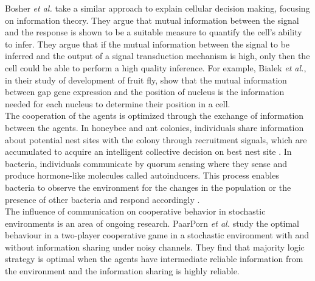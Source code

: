 Bosher \textit{et al.} \cite{Bowsher2014} take a similar approach to explain cellular decision making, focusing on information theory. They argue that mutual information between the signal and the response is shown to be a suitable measure to quantify the cell's ability to infer. They argue that if the mutual information between the signal to be inferred and the output of a signal transduction mechanism is high, only then the cell could be able to perform a high quality inference. For example, Bialek \textit{et al.}, in their study of development of fruit fly, show that the mutual information between gap gene expression and the position of nucleus is the information needed for each nucleus to determine their position in a cell. \\
The cooperation of the agents is optimized through the exchange of information between the agents. In honeybee and ant colonies, individuals share information about potential nest sites with the colony through recruitment signals, which are accumulated to acquire an intelligent collective decision on best nest site \cite{Franks2002}. In bacteria, individuals communicate by quorum sensing where they sense and produce hormone-like molecules called autoinducers. This process enables bacteria to observe the environment for the changes in the population or the presence of other bacteria and respond accordingly \cite{waters2005quorum}.\\
The influence of communication on cooperative behavior in stochastic environments is an area of ongoing research. PaarPorn \textit{et al.} \cite{Paarporn2018a} study the optimal behaviour in a two-player cooperative game in a stochastic environment with and without information sharing under noisy channels. They find that majority logic strategy is optimal when the agents have intermediate reliable information from the environment and the information sharing is highly reliable.

